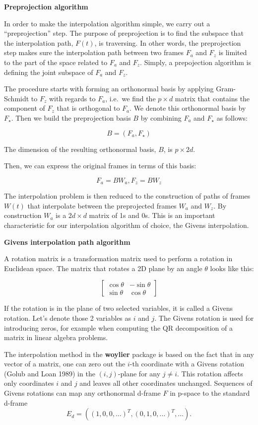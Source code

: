 \textbf{Preprojection algorithm}

In order to make the interpolation algorithm simple, we carry out a ``preprojection'' step.
The purpose of preprojection is to find the subspace that the interpolation path, \(F(t)\), is traversing. In other words, the preprojection step makes sure the interpolation path between two frames \(F_a\) and \(F_z\) is limited to the part of the space related to \(F_a\) and \(F_z\). Simply, a prepojection algorithm is defining the joint subspace of \(F_a\) and \(F_z\).

The procedure starts with forming an orthonormal basis by applying Gram-Schmidt to \(F_z\) with regards to \(F_a\), i.e.~we find the \(p\times d\) matrix that contains the component of \(F_z\) that is orthogonal to \(F_a\). We denote this orthonormal basis by \(F_\star\). Then we build the preprojection basis \(B\) by combining \(F_a\) and \(F_\star\) as follows:

\[B = (F_a, F_{\star})\]

The dimension of the resulting orthonormal basis, \(B\), is \(p\times 2d\).

Then, we can express the original frames in terms of this basis:

\[F_a = B W_a, F_z = B W_z\]

The interpolation problem is then reduced to the construction of paths of frames \(W(t)\) that interpolate between the preprojected frames \(W_a\) and \(W_z\). By construction \(W_a\) is a \(2d\times d\) matrix of 1s and 0s. This is an important characteristic for our interpolation algorithm of choice, the Givens interpolation.

\textbf{Givens interpolation path algorithm}

A rotation matrix is a transformation matrix used to perform a rotation in Euclidean space. The matrix that rotates a 2D plane by an angle \(\theta\) looks like this:

\[ \begin{bmatrix}\cos \theta &-\sin \theta \\\sin \theta &\cos \theta \end{bmatrix} \]

If the rotation is in the plane of two selected variables, it is called a Givens rotation. Let's denote those 2 variables as \(i\) and \(j\). The Givens rotation is used for introducing zeros, for example when computing the QR decomposition of a matrix in linear algebra problems.

The interpolation method in the \textbf{woylier} package is based on the fact that in any vector of a matrix, one can zero out the \(i\)-th coordinate with a Givens rotation (Golub and Loan 1989) in the \((i, j)\)-plane for any \(j\neq i\). This rotation affects only coordinates \(i\) and \(j\) and leaves all other coordinates unchanged.
Sequences of Givens rotations can map any orthonormal d-frame \(F\) in p-space to the standard d-frame
\[E_d=((1, 0, 0, ...)^T, (0, 1, 0, ...)^T, ...).\]

